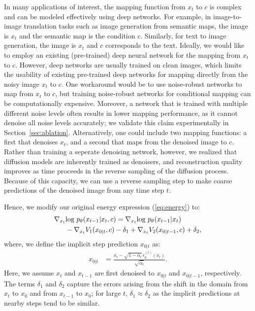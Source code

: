 \documentclass[10pt,twocolumn,letterpaper]{article}
\begin{document}
\label{sec:energyfn}
In many applications of interest, the mapping function from $x_t$ to $c$ is complex and can be modeled effectively using deep networks. For example, in image-to-image translation tasks such as image generation from semantic maps\cite{park2019semantic}, the image is $x_t$ and the semantic map is the condition $c$. Similarly, for text to image generation, the image is $x_t$ and $c$ corresponds to the text. Ideally, we would like to employ an existing (pre-trained) deep neural network for the mapping from $x_t$ to $c$. However, deep networks are usually trained on clean images, which limits the usability of existing pre-trained deep networks for mapping directly from the noisy image $x_t$ to $c$. One workaround would be to use noise-robust networks to map from $x_t$ to $c$, but training noise-robust networks for conditional mapping can be computationally expensive. Moreover, a network that is trained with multiple different noise levels often results in lower mapping performance, as it cannot denoise all noise levels accurately; we validate this claim experimentally in Section~\ref{sec:ablation}. Alternatively, one could include two mapping functions: a first that denoises $x_t$, and a second that maps from the denoised image to $c$. Rather than training a seperate denoising network, however, we realized that diffusion models are inherently trained as denoisers, and reconstruction quality improves as time proceeds in the reverse sampling of the diffusion process. Because of this capacity, we can use a reverse sampling step to make coarse predictions of the denoised image from any time step $t$. 

Hence, we modify our original energy expression (\ref{eq:energy}) to: 
\begin{align}
   \nabla_{x_t} &\text{log } p_{\theta}(x_{t-1}|x_{t},c) =
   \nabla_{x_t} \text{log } p_{\theta}(x_{t-1}|x_{t})\notag\\ &-\nabla_{x_t} V_1(x_{0|t},c) -\delta_1 + \nabla_{x_t} V_2(x_{0|t-1},c)+\delta_2,
\end{align}
where, we define the implicit step prediction $x_{0|t}$ as:
\begin{align}
    x_{0|t} &=\frac{x_t - \sqrt{1 - \bar{\alpha}_t} \, \epsilon_\theta^{(t)}(x_t)}{\sqrt{\bar{\alpha_t}}}. 
    \label{eq:implicit}
\end{align}
Here, we assume $x_t$ and $x_{t-1}$ are first denoised to  $x_{0|t}$ and $x_{0|t-1}$, respectively.
 The terms $\delta_1$ and $\delta_2$ capture the errors arising from the shift in the domain from $x_t$ to $x_0$ and from $x_{t-1}$ to $x_0$; for large $t$, $\delta_1 \approx \delta_2$ as the implicit predictions at nearby steps tend to be similar. 
 
\end{document}
